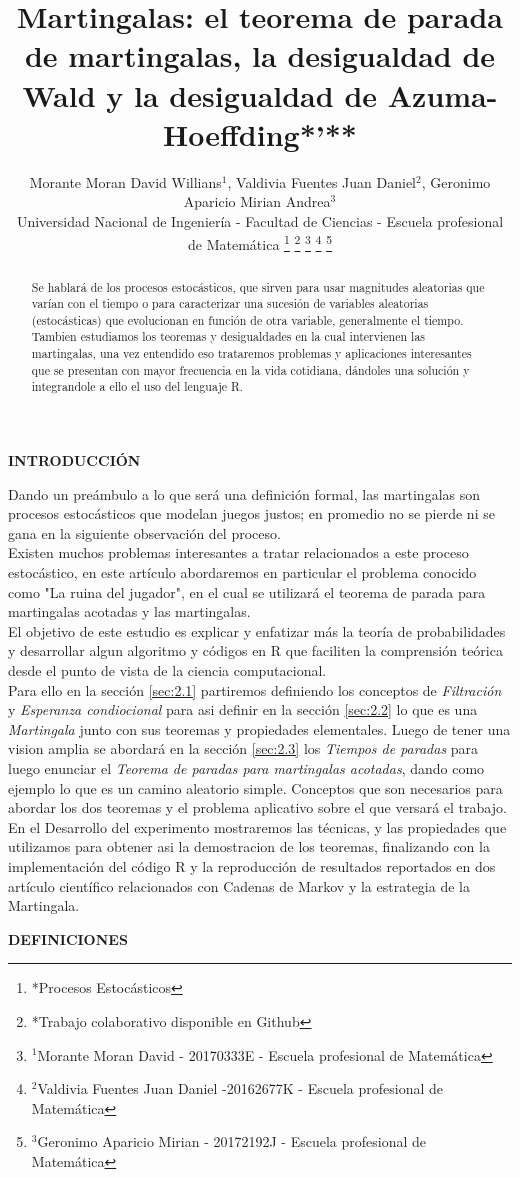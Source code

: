 \documentclass[letterpaper, 10 pt, conference]{ieeeconf}  %
\title{\LARGE \bf
Martingalas: el teorema de parada de martingalas, la desigualdad de Wald y la desigualdad de Azuma-Hoeffding*'**
}
\author{Morante Moran David Willians$^{1}$, Valdivia Fuentes Juan Daniel$^{2}$, Geronimo Aparicio Mirian Andrea$^{3}$\\
 \small Universidad Nacional de Ingeniería - Facultad de Ciencias - Escuela profesional de Matemática
\thanks{*Procesos Estocásticos}%
\thanks{*Trabajo colaborativo disponible en Github}
\thanks{$^{1}$Morante Moran David - 20170333E - Escuela profesional de Matemática
        }%
\thanks{$^{2}$Valdivia Fuentes Juan Daniel -20162677K - Escuela profesional de Matemática
        }%
 \thanks{$^{3}$Geronimo Aparicio Mirian - 20172192J - Escuela profesional de Matemática
      }%
}
\begin{document}
\maketitle
\thispagestyle{empty}
\pagestyle{empty}


\begin{abstract}
 Se hablará de los procesos estocásticos, que sirven para usar magnitudes aleatorias que varían con el tiempo o para caracterizar una sucesión de variables aleatorias (estocásticas) que evolucionan en función de otra variable, generalmente el tiempo.
Tambien  estudiamos los teoremas y desigualdades en la cual intervienen las martingalas, una vez entendido eso trataremos problemas y aplicaciones interesantes que se presentan con mayor frecuencia en la vida cotidiana, dándoles una solución y  integrandole a ello el uso del lenguaje R.

\end{abstract}


\begin{center}
   \bf{INTRODUCCIÓN}
\end{center}
\label{sec:1}
Dando un preámbulo a lo que será una definición formal, las martingalas son procesos estocásticos que modelan juegos justos; en promedio no se pierde ni se gana en la siguiente observación del proceso.\\

Existen muchos problemas interesantes a tratar relacionados a este proceso estocástico, en este artículo abordaremos  en particular  el problema conocido como "La ruina del jugador", en el cual se utilizará el teorema de parada para martingalas acotadas y las martingalas.\\

El objetivo de este estudio es  explicar y enfatizar más la teoría de probabilidades  y desarrollar algun algoritmo y códigos en R que faciliten la comprensión teórica desde el punto de vista de la ciencia computacional. \\

Para ello  en la sección \ref{sec:2.1} partiremos definiendo los conceptos de \textit{Filtración} y \textit{Esperanza condiocional} para asi definir  en la sección \ref{sec:2.2} lo que es una \textit{Martingala} junto con sus teoremas y propiedades elementales. Luego de tener una vision amplia se abordará en la sección \ref{sec:2.3} los\textit{ Tiempos de paradas} para luego enunciar el \textit{Teorema de paradas para martingalas acotadas}, dando como ejemplo lo que es un camino aleatorio simple. Conceptos que son necesarios para abordar los dos teoremas y el problema aplicativo  sobre el que versará el trabajo. En el Desarrollo del experimento mostraremos las técnicas, y las propiedades que utilizamos para obtener asi la demostracion de los teoremas, finalizando con la implementación del código R y la reproducción de resultados reportados en dos artículo científico relacionados con Cadenas de Markov y la estrategia de la Martingala.
\newpage
\begin{center}\label{sec:2}
    \bf{ DEFINICIONES}
\end{center}
\end{document}
